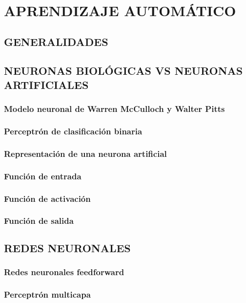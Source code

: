 \chapter{APRENDIZAJE AUTOMÁTICO}\label{chp:Teoria}%

\section{GENERALIDADES}

\section{NEURONAS BIOLÓGICAS VS NEURONAS ARTIFICIALES}

\subsection{ Modelo neuronal de Warren McCulloch y Walter Pitts}

\subsection{Perceptrón de clasificación binaria}

\subsection{Representación de una neurona artificial}

\subsection{Función de entrada}

\subsection{Función de activación}

\subsection{ Función de salida}

\section{REDES NEURONALES}

\subsection{Redes neuronales feedforward}

\subsection{Perceptrón multicapa}

